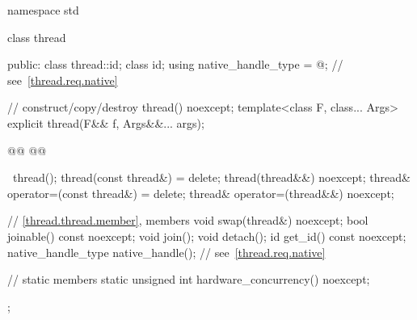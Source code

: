 \documentclass{wg21}
\begin{document}
\begin{codeblock}
namespace std {
    class thread {
        public:
        class thread::id;
        class id;
        using native_handle_type = @\impdefnc@;         // see~\ref{thread.req.native}

        // construct/copy/destroy
        thread() noexcept;
        template<class F, class... Args> explicit thread(F&& f, Args&&... args);

        @@
        @@

        ~thread();
        thread(const thread&) = delete;
        thread(thread&&) noexcept;
        thread& operator=(const thread&) = delete;
        thread& operator=(thread&&) noexcept;

        // \ref{thread.thread.member}, members
        void swap(thread&) noexcept;
        bool joinable() const noexcept;
        void join();
        void detach();
        id get_id() const noexcept;
        native_handle_type native_handle();                         // see~\ref{thread.req.native}

        // static members
        static unsigned int hardware_concurrency() noexcept;
    };
}
\end{codeblock}
\end{document}

